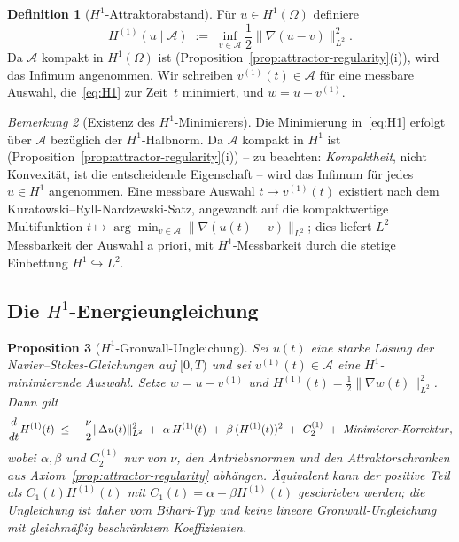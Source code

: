 \documentclass[12pt,a4paper]{article}
\theoremstyle{definition}
\newtheorem{definition}{Definition}[section]
\theoremstyle{plain}
\newtheorem{proposition}[definition]{Proposition}
\theoremstyle{remark}
\newtheorem{remark}[definition]{Bemerkung}
\begin{document}
\begin{definition}[$H^1$-Attraktorabstand]\label{def:H1}
Für $u \in H^1(\Omega)$ definiere
\begin{equation}\label{eq:H1}
  H^{(1)}\!(u \mid \mathcal{A})
  \;:=\;
  \inf_{v \in \mathcal{A}}
  \frac{1}{2}\|\nabla(u - v)\|_{L^2}^2.
\end{equation}
Da $\mathcal{A}$ kompakt in $H^1(\Omega)$ ist
(Proposition~\ref{prop:attractor-regularity}(i)), wird das Infimum
angenommen. Wir schreiben $v^{(1)}(t) \in \mathcal{A}$ für eine
messbare Auswahl, die~\eqref{eq:H1} zur Zeit~$t$ minimiert,
und $w = u - v^{(1)}$.
\end{definition}

\begin{remark}[Existenz des $H^1$-Minimierers]
Die Minimierung in~\eqref{eq:H1} erfolgt über $\mathcal{A}$ bezüglich
der $H^1$-Halbnorm. Da $\mathcal{A}$ kompakt
in $H^1$ ist (Proposition~\ref{prop:attractor-regularity}(i)) -- zu beachten:
\emph{Kompaktheit}, nicht Konvexität, ist die entscheidende
Eigenschaft -- wird das Infimum für jedes $u \in H^1$ angenommen.
Eine messbare Auswahl $t \mapsto v^{(1)}(t)$ existiert nach dem
Kuratowski--Ryll-Nardzewski-Satz, angewandt auf die kompaktwertige
Multifunktion $t \mapsto \arg\min_{v \in \mathcal{A}}
\|\nabla(u(t)-v)\|_{L^2}$; dies liefert $L^2$-Messbarkeit
der Auswahl a priori, mit $H^1$-Messbarkeit durch die
stetige Einbettung $H^1 \hookrightarrow L^2$.
\end{remark}

\subsection{Die \texorpdfstring{$H^1$}{H1}-Energieungleichung}

\begin{proposition}[$H^1$-Gronwall-Ungleichung]\label{prop:H1-Gronwall}
Sei $u(t)$ eine starke Lösung der Navier--Stokes-Gleichungen
auf $[0,T)$ und sei $v^{(1)}(t) \in \mathcal{A}$ eine $H^1$-minimierende
Auswahl. Setze $w = u - v^{(1)}$ und
$H^{(1)}(t) = \tfrac{1}{2}\|\nabla w(t)\|_{L^2}^2$. Dann gilt
\begin{equation}\label{eq:H1-ineq}
  \frac{d}{dt}H^{(1)}(t)
  \;\le\;
  -\frac{\nu}{2}\|\Delta u(t)\|_{L^2}^2
  \;+\; \alpha\,H^{(1)}(t)
  \;+\; \beta\,(H^{(1)}(t))^2
  \;+\; C_2^{(1)}
  \;+\; \text{\emph{Minimierer-Korrektur}},
\end{equation}
wobei $\alpha,\beta$ und $C_2^{(1)}$ nur von $\nu$, den Antriebsnormen und
den Attraktorschranken aus Axiom~\ref{prop:attractor-regularity} abhängen.
Äquivalent kann der positive Teil als $C_1(t)H^{(1)}(t)$ mit
$C_1(t)=\alpha+\beta H^{(1)}(t)$ geschrieben werden; die Ungleichung ist
daher vom Bihari-Typ und keine lineare Gronwall-Ungleichung mit gleichmäßig
beschränktem Koeffizienten.
\end{proposition}
\end{document}
